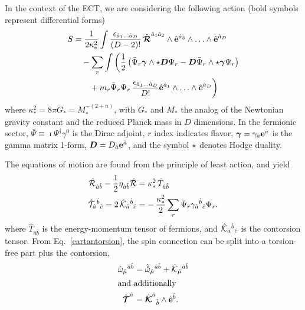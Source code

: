 \documentclass[twocolumn,showpacs,showkeys,prd,superscriptaddress]{revtex4-1}
\begin{document}

In the context of the ECT, we are considering the following action (bold symbols represent differential forms)
\begin{align}
  \nonumber
  S &= \frac{1}{2\kappa_*^2}\int\frac{\epsilon_{\hat{a}_1\ldots\hat{a}_D}}{(D-2)!}\,\hat{{\boldsymbol{\mathcal{R}}}}^{\hat{a}_1\hat{a}_2}\wedge\hat{{\bf{e}}}^{\hat{a}_3}\wedge\ldots\wedge\hat{{\bf{e}}}^{\hat{a}_D} \\
  \nonumber
  &\quad- \sum_{r}\int\bigg(\frac{1}{2}\left(\bar{\Psi}_r{\boldsymbol{\gamma}}\wedge\star{\boldsymbol{D}}\Psi_r - {\boldsymbol{D}}\bar{\Psi}_r\wedge\star{\boldsymbol{\gamma}}\Psi_r\right) \\
  \label{formaction}
  &\qquad + m_r \bar{\Psi}_r\Psi_r\,\frac{\epsilon_{\hat{a}_1\ldots\hat{a}_D}}{D!}\hat{{\bf{e}}}^{\hat{a}_1}\wedge\ldots\wedge\hat{{\bf{e}}}^{\hat{a}_D}\bigg)
\end{align}
where $\kappa_*^2 = 8\pi G_* = M_*^{-(2+n)}$, with $G_*$ and $M_*$  the analog of the Newtonian gravity constant and the reduced Planck mass in $D$ dimensions. In the fermionic sector, $\bar{\Psi}\equiv\imath\Psi^\dagger\gamma^0$ is the Dirac adjoint,  $r$ index indicates flavor, \mbox{${\boldsymbol{\gamma}}=\gamma_{\hat{a}}{\bf{e}}^{\hat{a}}$} is the gamma matrix 1-form, \mbox{${\boldsymbol{D}}=D_{\hat{a}}{\bf{e}}^{\hat{a}}$}, and the symbol $\star$ denotes Hodge duality.

The equations of motion are found from the principle of least action, and yield
\begin{align}
  \label{einsteineom}
  \hat{{\mathcal{R}}}_{\hat{a}\hat{b}} - \frac{1}{2}{\eta}_{\hat{a}\hat{b}}\hat{{\mathcal{R}}} &= \kappa_*^2\,\hat{T}_{\hat{a}\hat{b}} \\
  \label{contorsionfound}
  \hat{\mathcal{T}}_{\hat{a}}{}^{\hat{b}}{}_{\hat{c}} = 2\,\hat{\mathcal{K}}_{\hat{a}}{}^{\hat{b}}{}_{\hat{c}} &= -\, \frac{\kappa_*^2}{2}\sum_{r}\bar{\Psi}_r\gamma_{\hat{a}}{}^{\hat{b}}{}_{\hat{c}}\Psi_r.
\end{align}
where $\hat{T}_{\hat{a}\hat{b}}$ is the energy-momentum tensor of fermions, and $\hat{\mathcal{K}}_{\hat{a}}{}^{\hat{b}}{}_{\hat{c}}$ is the contorsion tensor. From Eq.~\eqref{cartantorsion}, the spin connection can be split into a torsion-free part plus the contorsion,
\begin{align}
  \hat{\omega}_{\hat{\mu}}{}^{\hat{a}\hat{b}} &= \hat{\mathring{\omega}}_{\hat{\mu}}{}^{\hat{a}\hat{b}} + \hat{\mathcal{K}}_{\hat{\mu}}{}^{\hat{a}\hat{b}}\\
  \intertext{and additionally}
  \hat{{\boldsymbol{\mathcal{T}}}}^{\hat{a}_{}} &= {\hat{{\boldsymbol{\mathcal{K}}}}^{\hat{a}}{}_{\hat{b}}}\wedge \hat{{\bf{e}}}^{\hat{b}}  .
\end{align}
\end{document}
